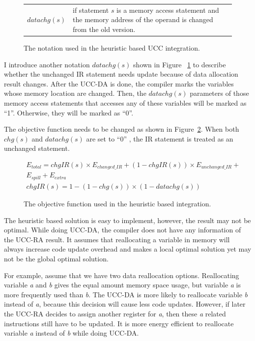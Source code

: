 \begin{figure}[htbp]
\begin{normalsize}
\begin{center}
\begin{tabular}{r|p{5in}} 
$datachg(s)$ & if statement $s$ is a memory access statement and the memory address of the operand is changed
from the old version.
\end{tabular}
\caption{ The notation used in the heuristic based UCC integration.}
\label{notation2}
\end{center}
\end{normalsize}
\end{figure}

I introduce another notation $datachg(s)$ shown in Figure ~\ref{notation2} to describe whether the unchanged IR
statement needs update because of data allocation result changes. After the UCC-DA is done, the compiler marks the 
variables whose memory location are changed. Then, the $datachg(s)$ parameters of those memory access statements that 
accesses any of these variables will be marked as ``1''. Otherwise, they will be marked as ``0''.


The objective function needs to be changed as shown in Figure~\ref{newObj}. When both $chg(s)$ and $datachg(s)$ are set 
to ``0'' , the IR statement is treated as an unchanged statement.
\begin{figure}[ht]
\begin{small}
\begin{eqnarray}
E_{total} = 
chgIR(s) \times E_{changed\_IR} + (1-chgIR(s))\times E_{unchanged\_IR} + \\
E_{spill} + E_{extra} \\
chgIR(s) =1-(1-chg(s))\times(1-datachg(s))
\end{eqnarray}
\end{small}
\caption{The objective function used in the heuristic based integration.}
\label{newObj}
\end{figure}

The heuristic based solution is easy to implement, however, the result may not be optimal.
While doing UCC-DA, the compiler does not have any information of the UCC-RA result.
It assumes that reallocating a variable in memory will always increase 
code update overhead and makes a local optimal solution yet may not be the global
optimal solution.

For example, assume that we have two data reallocation options. Reallocating variable
{\it a} and {\it b} gives the equal amount memory space usage, but variable {\it a}
is more frequently used than {\it b}. The UCC-DA is more likely to reallocate variable
{\it b} instead of {\it a}, because this decision will cause less code updates.
However, if later the UCC-RA decides to assign another register for {\it a}, then these {\it a} related instructions 
still 
have to be updated. It is more energy efficient to reallocate variable {\it a} instead
of {\it b} while doing UCC-DA.

